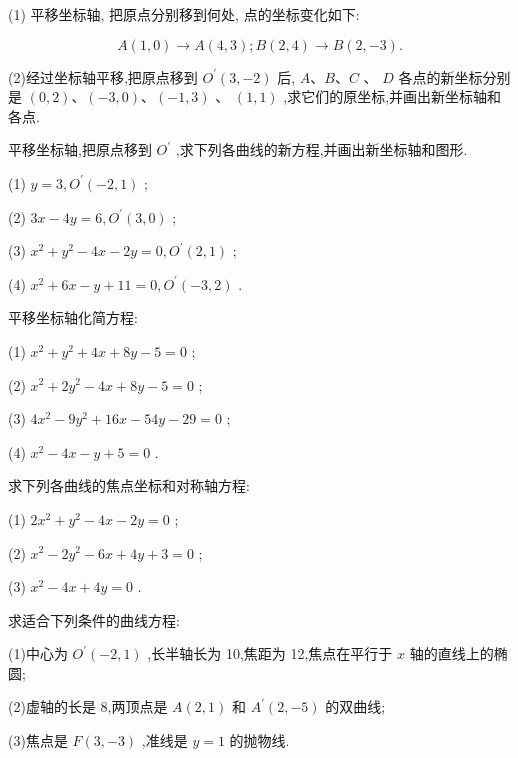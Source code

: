 \documentclass[lang=cn,newtx,10pt,scheme=chinese]{elegantbook}
\begin{document}
\begin{problemset}[习 题 十]

\item (1) 平移坐标轴, 把原点分别移到何处, 点的坐标变化如下:

\[
  A\left( {1,0}\right) \rightarrow A\left( {4,3}\right) ;B\left( {2,4}\right) \rightarrow B\left( {2, - 3}\right) .
\]

(2)经过坐标轴平移,把原点移到 \({O}^{\prime }\left( {3, - 2}\right)\) 后, \(A\text{、}B\text{、}C\) 、 \(D\) 各点的新坐标分别是 \(\left( {0,2}\right) \text{、}\left( {-3,0}\right) \text{、}\left( {-1,3}\right)\) 、 \(\left( {1,1}\right)\) ,求它们的原坐标,并画出新坐标轴和各点.

\item 平移坐标轴,把原点移到 \({O}^{\prime }\) ,求下列各曲线的新方程,并画出新坐标轴和图形.

(1) \(y = 3,{O}^{\prime }\left( {-2,1}\right)\) ;

(2) \({3x} - {4y} = 6,{O}^{\prime }\left( {3,0}\right)\) ;

(3) \({x}^{2} + {y}^{2} - {4x} - {2y} = 0,{O}^{\prime }\left( {2,1}\right)\) ;

(4) \({x}^{2} + {6x} - y + {11} = 0,{O}^{\prime }\left( {-3,2}\right)\) .

\item 平移坐标轴化简方程:

(1) \({x}^{2} + {y}^{2} + {4x} + {8y} - 5 = 0\) ;

(2) \({x}^{2} + 2{y}^{2} - {4x} + {8y} - 5 = 0\) ;

(3) \(4{x}^{2} - 9{y}^{2} + {16x} - {54y} - {29} = 0\) ;

(4) \({x}^{2} - {4x} - y + 5 = 0\) .

\item 求下列各曲线的焦点坐标和对称轴方程:

(1) \(2{x}^{2} + {y}^{2} - {4x} - {2y} = 0\) ;

(2) \({x}^{2} - 2{y}^{2} - {6x} + {4y} + 3 = 0\) ;

(3) \({x}^{2} - {4x} + {4y} = 0\) .

\item 求适合下列条件的曲线方程:

(1)中心为 \({O}^{\prime }\left( {-2,1}\right)\) ,长半轴长为 10,焦距为 12,焦点在平行于 \(x\) 轴的直线上的椭圆;

(2)虚轴的长是 8,两顶点是 \(A\left( {2,1}\right)\) 和 \({A}^{\prime }\left( {2, - 5}\right)\) 的双曲线;

(3)焦点是 \(F\left( {3, - 3}\right)\) ,准线是 \(y = 1\) 的抛物线.

\end{problemset}
\end{document}
